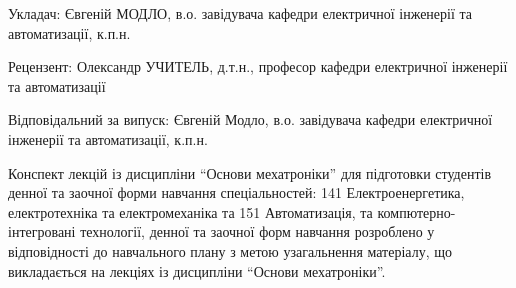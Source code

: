 \begin{titlepage}
\vspace{2cm}
Укладач: Євгеній МОДЛО, в.о. завідувача кафедри електричної інженерії та автоматизації, к.п.н.

\vspace{2cm}
Рецензент: Олександр УЧИТЕЛЬ, д.т.н., професор кафедри електричної інженерії та автоматизації

\vspace{2cm}
 Відповідальний за випуск: Євгеній Модло, в.о. завідувача кафедри електричної інженерії та автоматизації, к.п.н.

\vspace{2cm} 
Конспект лекцій із дисципліни ``Основи мехатроніки'' для підготовки студентів денної та заочної форми навчання спеціальностей: 141 Електроенергетика, електротехніка та електромеханіка та 151 Автоматизація, та компютерно-інтегровані технології, денної та заочної форм навчання розроблено у відповідності до навчального плану з метою узагальнення матеріалу, що викладається на лекціях із дисципліни ``Основи мехатроніки''.
\end{titlepage}